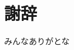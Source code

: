 \documentclass[a4paper,xelatex,ja=standard,hiresbb,12pt]{bxjsarticle}
\begin{document}
    \section*{謝辞}
    みんなありがとな
    
\end{document}
